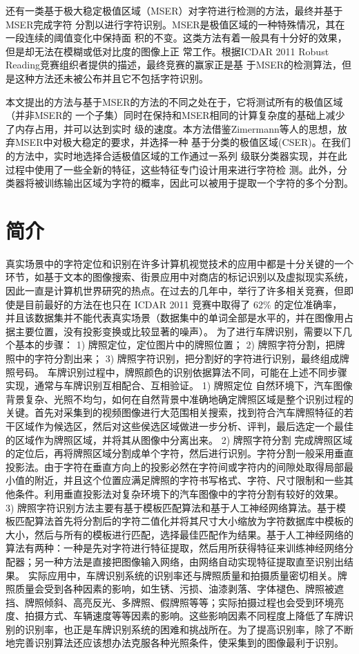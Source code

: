 \documentclass[UTF8]{article}
\begin{document}
还有一类基于极大稳定极值区域（MSER）对字符进行检测的方法，最终并基于MSER完成字符
分割以进行字符识别。MSER是极值区域的一种特殊情况，其在一段连续的阈值变化中保持面
积的不变。这类方法有着一般具有十分好的效果，但是却无法在模糊或低对比度的图像上正
常工作。根据ICDAR 2011 Robust Reading竞赛组织者提供的描述，最终竞赛的赢家正是基
于MSER的检测算法，但是这种方法还未被公布并且它不包括字符识别。

本文提出的方法与基于MSER的方法的不同之处在于，它将测试所有的极值区域（并非MSER的
一个子集）同时在保持和MSER相同的计算复杂度的基础上减少了内存占用，并可以达到实时
级的速度。本方法借鉴Zimermann等人的思想，放弃MSER中对极大稳定的要求，并选择一种
基于分类的极值区域(CSER)。在我们的方法中，实时地选择合适极值区域的工作通过一系列
级联分类器实现，并在此过程中使用了一些全新的特征，这些特征专门设计用来进行字符检
测。此外，分类器将被训练输出区域为字符的概率，因此可以被用于提取一个字符的多个分割。

\section{简介}

真实场景中的字符定位和识别在许多计算机视觉技术的应用中都是十分关键的一个环节，如基于文本的图像搜索、街景应用中对商店的标记识别以及虚拟现实系统，
因此一直是计算机世界研究的热点。在过去的几年中，举行了许多相关竞赛，但即使是目前最好的方法在也只在 ICDAR 2011 竞赛中取得了 62\% 的定位准确率，
并且该数据集并不能代表真实场景（数据集中的单词全部是水平的，并在图像用占据主要位置，没有投影变换或比较显著的噪声）。
为了进行车牌识别，需要以下几个基本的步骤：
1) 牌照定位，定位图片中的牌照位置；
2) 牌照字符分割，把牌照中的字符分割出来；
3) 牌照字符识别，把分割好的字符进行识别，最终组成牌照号码。
车牌识别过程中，牌照颜色的识别依据算法不同，可能在上述不同步骤实现，通常与车牌识别互相配合、互相验证。
1) 牌照定位
自然环境下，汽车图像背景复杂、光照不均匀，如何在自然背景中准确地确定牌照区域是整个识别过程的关键。首先对采集到的视频图像进行大范围相关搜索，找到符合汽车牌照特征的若干区域作为候选区，然后对这些侯选区域做进一步分析、评判，最后选定一个最佳的区域作为牌照区域，并将其从图像中分离出来。
2) 牌照字符分割
完成牌照区域的定位后，再将牌照区域分割成单个字符，然后进行识别。字符分割一般采用垂直投影法。由于字符在垂直方向上的投影必然在字符间或字符内的间隙处取得局部最小值的附近，并且这个位置应满足牌照的字符书写格式、字符、尺寸限制和一些其他条件。利用垂直投影法对复杂环境下的汽车图像中的字符分割有较好的效果。
3) 牌照字符识别方法主要有基于模板匹配算法和基于人工神经网络算法。基于模板匹配算法首先将分割后的字符二值化并将其尺寸大小缩放为字符数据库中模板的大小，然后与所有的模板进行匹配，选择最佳匹配作为结果。基于人工神经网络的算法有两种：一种是先对字符进行特征提取，然后用所获得特征来训练神经网络分配器；另一种方法是直接把图像输入网络，由网络自动实现特征提取直至识别出结果。
实际应用中，车牌识别系统的识别率还与牌照质量和拍摄质量密切相关。牌照质量会受到各种因素的影响，如生锈、污损、油漆剥落、字体褪色、牌照被遮挡、牌照倾斜、高亮反光、多牌照、假牌照等等；实际拍摄过程也会受到环境亮度、拍摄方式、车辆速度等等因素的影响。这些影响因素不同程度上降低了车牌识别的识别率，也正是车牌识别系统的困难和挑战所在。为了提高识别率，除了不断地完善识别算法还应该想办法克服各种光照条件，使采集到的图像最利于识别。
\end{document}
